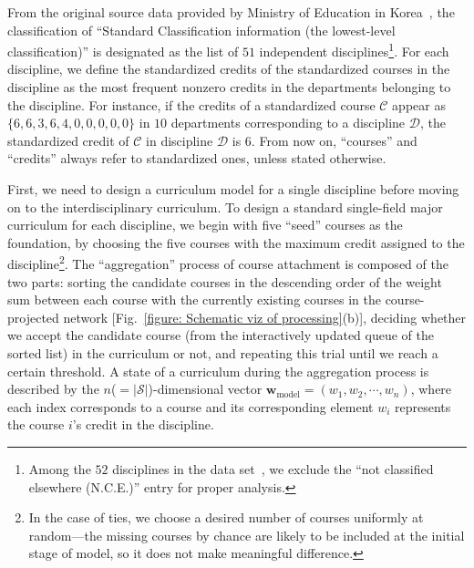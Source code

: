 \documentclass{bmcart}
\begin{document}
From the original source data provided by Ministry of Education in Korea~\cite{data_go_kr}, the classification of ``Standard Classification information (the lowest-level classification)'' is designated as the list of $51$ independent disciplines\footnote{Among the $52$ disciplines in the data set~\cite{data_go_kr}, we exclude the ``not classified elsewhere (N.C.E.)'' entry for proper analysis. 
}.
For each discipline, we define the standardized credits of the standardized courses in the discipline as the most frequent nonzero credits in the departments belonging to the discipline. For instance, if the credits of a standardized course $\mathcal{C}$ appear as $\{ 6, 6, 3, 6, 4, 0, 0, 0, 0, 0 \}$ in $10$ departments corresponding to a discipline $\mathcal{D}$, the standardized credit of $\mathcal{C}$ in discipline $\mathcal{D}$ is $6$. From now on, ``courses'' and ``credits'' always refer to standardized ones, unless stated otherwise.

First, we need to design a curriculum model for a single discipline before moving on to the interdisciplinary curriculum. 
To design a standard single-field major curriculum for each discipline, we begin with five ``seed'' courses as the foundation, by choosing the five courses with the maximum credit assigned to the discipline\footnote{In the case of ties, we choose a desired number of courses uniformly at random---the missing courses by chance are likely to be included at the initial stage of model, so it does not make meaningful difference.}. The ``aggregation'' process of course attachment is composed of the two parts: sorting the candidate courses in the descending order of the weight sum between each course with the currently existing courses in the course-projected network [Fig.~\ref{figure: Schematic viz of processing}(b)], deciding whether we accept the candidate course (from the interactively updated queue of the sorted list) in the curriculum or not, and repeating this trial until we reach a certain threshold. 
A state of a curriculum during the aggregation process is described by the $n$($=|\mathcal{S}|$)-dimensional vector
\( \mathbf{w}_\mathrm{model} = \left( w_1, w_2, \cdots, w_n \right) \), where each index corresponds to a course and its corresponding element \( w_i \) represents the course \( i \)'s credit in the discipline.
\end{document}

